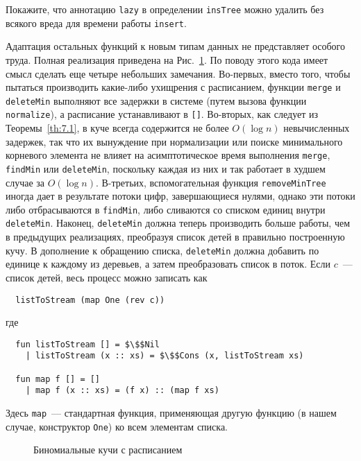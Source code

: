 \begin{exercise}\label{ex:7.3}
  Покажите, что аннотацию \lstinline!lazy! в определении
  \lstinline!insTree! можно удалить без всякого вреда для времени
  работы \lstinline!insert!.
\end{exercise}

Адаптация остальных функций к новым типам данных не представляет
особого труда. Полная реализация приведена на
Рис.~\ref{fig:7.2}. По поводу этого кода имеет смысл сделать еще
четыре небольших замечания. Во-первых, вместо того, чтобы пытаться
производить какие-либо ухищрения с расписанием, функции
\lstinline!merge! и \lstinline!deleteMin! выполняют все задержки в
системе (путем вызова функции \lstinline!normalize!), а расписание
устанавливают в \lstinline![]!. Во-вторых, как следует из
Теоремы~\ref{th:7.1}, в куче всегда содержится не более $O(\log n)$
невычисленных задержек, так что их вынуждение при нормализации или
поиске минимального корневого элемента не влияет на асимптотическое
время выполнения \lstinline!merge!, \lstinline!findMin! или
\lstinline!deleteMin!, поскольку каждая из них и так работает в худшем
случае за $O(\log n)$. В-третьих, вспомогательная функция
\lstinline!removeMinTree! иногда дает в результате потоки цифр,
завершающиеся нулями, однако эти потоки либо отбрасываются в
\lstinline!findMin!, либо сливаются со списком единиц внутри
\lstinline!deleteMin!. Наконец, \lstinline!deleteMin! должна теперь
производить больше работы, чем в предыдущих реализациях, преобразуя
список детей в правильно построенную кучу. В дополнение к обращению
списка, \lstinline!deleteMin! должна добавить по единице к каждому из
деревьев, а затем преобразовать список в поток. Если $c$~--- список
детей, весь процесс можно записать как
\begin{lstlisting}
  listToStream (map One (rev c))
\end{lstlisting}
где
\begin{lstlisting}
  fun listToStream [] = $\$$Nil
    | listToStream (x :: xs) = $\$$Cons (x, listToStream xs)

  fun map f [] = []
    | map f (x :: xs) = (f x) :: (map f xs)
\end{lstlisting}
Здесь \lstinline!map!~--- стандартная функция, применяющая другую
функцию (в нашем случае, конструктор \lstinline!One!) ко всем
элементам списка.

\begin{figure}
  \centering
  
  \caption{Биномиальные кучи с расписанием}
  \label{fig:7.2}
\end{figure}

